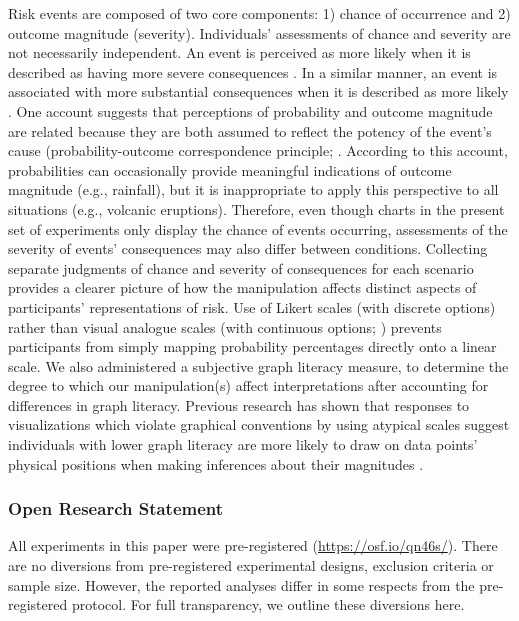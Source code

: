 \documentclass[journal]{vgtc}                %
\begin{document}
Risk events are composed of two core components: 1) chance of occurrence
and 2) outcome magnitude (severity). Individuals' assessments of chance
and severity are not necessarily independent. An event is perceived as
more likely when it is described as having more severe consequences
\citep{harris_estimating_2009, harris_communicating_2011}. In a similar
manner, an event is associated with more substantial consequences when
it is described as more likely \citep{kupor_probable_2020}. One account
suggests that perceptions of probability and outcome magnitude are
related because they are both assumed to reflect the potency of the
event's cause (probability-outcome correspondence principle; \citep{keren_probabilityoutcome_2001}. According to this account,
probabilities can occasionally provide meaningful indications of outcome
magnitude (e.g., rainfall), but it is inappropriate to apply this
perspective to all situations (e.g., volcanic eruptions). Therefore,
even though charts in the present set of experiments only display the
chance of events occurring, assessments of the severity of events'
consequences may also differ between conditions. Collecting separate
judgments of chance and severity of consequences for each scenario
provides a clearer picture of how the manipulation affects distinct
aspects of participants' representations of risk. Use of Likert scales
(with discrete options) rather than visual analogue scales (with
continuous options; \citep{sung_visual_2018}) prevents participants from
simply mapping probability percentages directly onto a linear scale. We
also administered a subjective graph literacy measure, to determine
the degree to which our manipulation(s) affect interpretations after
accounting for differences in graph literacy. Previous
research has shown that responses to visualizations which violate
graphical conventions by using atypical scales suggest individuals with
lower graph literacy are more likely to draw on data
points' physical positions when making inferences about their magnitudes
\citep{okan_how_2016, okan_when_2012}.

\hypertarget{open-research-statement}{%
\subsubsection{Open Research Statement}\label{open-research-statement}}

All experiments in this paper were pre-registered (\url{https://osf.io/qn46s/}). There are no diversions from pre-registered experimental designs, exclusion criteria
or sample size. However, the reported analyses differ in some respects
from the pre-registered protocol. For full transparency, we outline
these diversions here.
\end{document}
